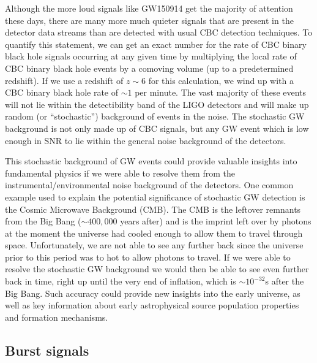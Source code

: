 Although the more loud signals like GW150914 get the majority of attention these days, there are many more much quieter signals that are present in the detector data streams than are detected with usual \ac{CBC} detection techniques. To quantify this statement, we can get an exact number for the rate of \ac{CBC} binary black hole signals occurring at any given time by multiplying the local rate of \ac{CBC} binary black hole events by a comoving volume (up to a predetermined redshift). If we use a redshift of $z \sim 6$ for this calculation, we wind up with a \ac{CBC} binary black hole rate of $\sim 1$ per minute. The vast majority of these events will not lie within the detectibility band of the \ac{LIGO} detectors and will make up random (or ``stochastic'') background of events in the noise. The stochastic \ac{GW} background is not only made up of \ac{CBC} signals, but any \ac{GW} event which is low enough in \ac{SNR} to lie within the general noise background of the detectors.

This stochastic background of \ac{GW} events could provide valuable insights into fundamental physics if we were able to resolve them from the instrumental/environmental noise background of the detectors. One common example used to explain the potential significance of stochastic \ac{GW} detection is the Cosmic Microwave Background (CMB). The CMB is the leftover remnants from the Big Bang ($\sim 400,000$ years after) and is the imprint left over by photons at the moment the universe had cooled enough to allow them to travel through space. Unfortunately, we are not able to see any further back since the universe prior to this period was to hot to allow photons to travel. If we were able to resolve the stochastic \ac{GW} background we would then be able to see even further back in time, right up until the very end of inflation, which is $\sim 10^{-32}$s after the Big Bang. Such accuracy could provide new insights into the early universe, as well as key information about early astrophysical source population properties and formation mechanisms. \cite{Romano2017}
 
\subsection{Burst signals}

